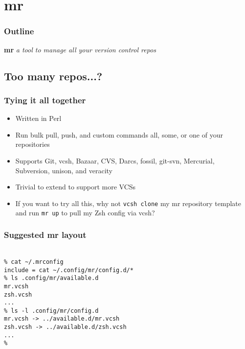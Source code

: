 \documentclass[t]{beamer}
\begin{document}
\section{mr}

\begin{frame}
	\frametitle{Outline}
	\tableofcontents[currentsection]
\end{frame}

\begin{frame}
		\begin{center}
			\vfill
			\vfill
			\textbf{mr}
			\vfill
			\textit{a tool to manage all your version control repos}
			\vfill
			\vfill
		\end{center}
\end{frame}

\subsection{Too many repos...?}

\begin{frame}
	\frametitle{Tying it all together}
	\begin{itemize}
		\item Written in Perl
		\item Run bulk pull, push, and custom commands all, some, or one of your repositories
		\item Supports Git, vcsh, Bazaar, CVS, Darcs, fossil, git-svn, Mercurial, Subversion, unison, and veracity
		\item Trivial to extend to support more VCSs
		\item If you want to try all this, why not \texttt{vcsh clone} my mr repository template and run \texttt{mr up} to pull my Zsh config via vcsh?
	\end{itemize}
\end{frame}

\begin{frame}
	\frametitle{Suggested mr layout}
	\texttt{ \\
		\% cat \~{}/.mrconfig \\
		include = cat \~{}/.config/mr/config.d/* \\
		\% ls .config/mr/available.d \\
		mr.vcsh \\
		zsh.vcsh \\
		... \\
		\% ls -l .config/mr/config.d \\
		mr.vcsh -> ../available.d/mr.vcsh \\
		zsh.vcsh -> ../available.d/zsh.vcsh \\
		... \\
		\%
	}
\end{frame}
\end{document}
